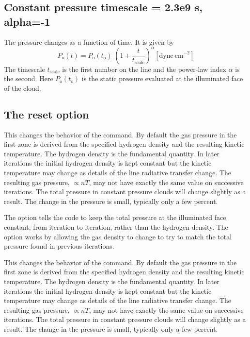\subsection{Constant pressure timescale = 2.3e9 s, alpha=-1}
\label{sec:ConstantPressureTimescale}

The pressure changes as a function of time.
It is given by
\begin{equation}
P_{\mathrm{o}}(t)=P_{\mathrm{o}}(t_{\mathrm{o}})\;\left(1+\frac{t}{t_{\mathrm{scale}}}\right)^{\alpha}
[\mathrm{dyne\ cm}^{-2}]
\end{equation}
The timescale $t_{\mathrm{scale}}$ is the first number on the line
and the power-law index $\alpha$ is the second.
Here $P_{\mathrm{o}}(t_{\mathrm{o}})$ is the static pressure evaluated at 
the illuminated face of the cloud.

\subsection{The reset option}

This changes the behavior of the  command.
By default the gas pressure in the first zone is derived from
the specified hydrogen density and the resulting kinetic temperature.
The hydrogen density is the fundamental quantity.
In later iterations the initial hydrogen density 
is kept constant but the kinetic temperature may change
as details of the line radiative transfer change. 
The resulting gas pressure, $\propto nT$,
may not have exactly the same value on successive iterations.
The total pressure in constant pressure clouds will change 
slightly as a result.
The change in the pressure is small, typically only
a few percent. 

The  option tells the code to keep the total pressure
at the illuminated face constant, from iteration to iteration,
rather than the hydrogen density.
The  option works by allowing the gas density
to change to try to match the total pressure 
found in previous iterations.

This changes the behavior of the  command.
By default the gas pressure in the first zone is derived from
the specified hydrogen density and the resulting kinetic temperature.
The hydrogen density is the fundamental quantity.
In later iterations the initial hydrogen density 
is kept constant but the kinetic temperature may change
as details of the line radiative transfer change. 
The resulting gas pressure, $\propto nT$,
may not have exactly the same value on successive iterations.
The total pressure in constant pressure clouds will change 
slightly as a result.
The change in the pressure is small, typically only
a few percent. 


